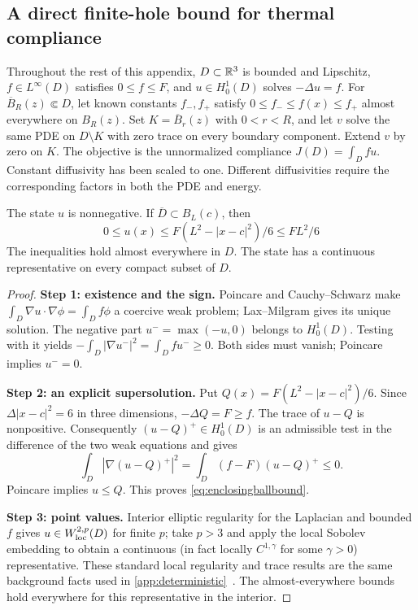 \subsection{A direct finite-hole bound for thermal compliance}

Throughout the rest of this appendix, $D\subset\mathbb{R}^3$ is bounded and
Lipschitz, $f\in L^\infty(D)$ satisfies $0\le f\le F$, and
$u\in H_0^1(D)$ solves $-\Delta u=f$. For $\overline B_R(z)\Subset D$,
let known constants $f_-,f_+$ satisfy
$0\le f_-\le f(x)\le f_+$ almost everywhere on $B_R(z)$.
Set $K=\overline B_r(z)$ with $0<r<R$, and let $v$ solve the same PDE on
$D\setminus K$ with zero trace on every boundary component. Extend $v$ by
zero on $K$. The objective is the unnormalized compliance $J(D)=\int_Dfu$.
Constant diffusivity has been scaled to one. Different diffusivities require
the corresponding factors in both the PDE and energy.

\begin{lemma}
\label{lem:benefitstatebounds}
The state $u$ is nonnegative. If $\overline D\subset B_L(c)$, then
\begin{equation}
 0\le u(x)\le F(L^2-|x-c|^2)/6\le FL^2/6
 \label{eq:enclosingballbound}
\end{equation}
The inequalities hold almost everywhere in $D$. The state has a continuous representative on every compact subset of $D$.
\end{lemma}
\begin{proof}
\textbf{Step 1: existence and the sign.}
Poincare and Cauchy--Schwarz make $\int_D\nabla u\cdot\nabla\phi=\int_Df\phi$
a coercive weak problem; Lax--Milgram gives its unique solution.
The negative part $u^-=\max(-u,0)$ belongs to $H_0^1(D)$. Testing with it
yields $-\int_D|\nabla u^-|^2=\int_Dfu^-\ge0$. Both sides must vanish;
Poincare implies $u^-=0$.

\textbf{Step 2: an explicit supersolution.}
Put $Q(x)=F(L^2-|x-c|^2)/6$. Since $\Delta|x-c|^2=6$ in three dimensions,
$-\Delta Q=F\ge f$. The trace of $u-Q$ is nonpositive. Consequently
$(u-Q)^+\in H_0^1(D)$ is an admissible test in the difference of the two
weak equations and gives
\[
 \int_D|\nabla(u-Q)^+|^2=\int_D(f-F)(u-Q)^+\le0.
\]
Poincare implies $u\le Q$. This proves \cref{eq:enclosingballbound}.

\textbf{Step 3: point values.}
Interior elliptic regularity for the Laplacian and bounded $f$ gives
$u\in W_{\rm loc}^{2,p}(D)$ for finite $p$; take $p>3$ and apply the local
Sobolev embedding to obtain a continuous (in fact locally $C^{1,\gamma}$
for some $\gamma>0$) representative. These standard local regularity and
trace results are the same background facts used in
\cref{app:deterministic}~\cite{evans2010pde,gilbarg2001elliptic}.
The almost-everywhere bounds hold everywhere for this representative in
the interior.
\end{proof}

